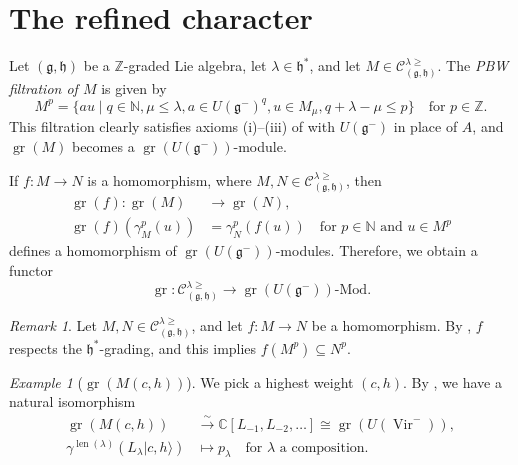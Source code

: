 \documentclass[a4paper, 12pt, reqno]{amsart}
\theoremstyle{remark}
\newtheorem{remark}[theorem]{Remark}
\newtheorem{example}[theorem]{Example}
\DeclareMathOperator{\Vir}{Vir}
\DeclareMathOperator{\len}{len}
\DeclareMathOperator{\gr}{gr}
\begin{document}
\section{The refined character}
\label{sec:refined-character}

Let $(\mathfrak{g}, \mathfrak{h})$ be a $\mathbb{Z}$-graded Lie algebra, let $\lambda \in \mathfrak{h}^*$, and let $M \in \mathcal{C}^{\lambda \ge}_{(\mathfrak{g}, \mathfrak{h})}$.
The \emph{PBW filtration of $M$} is given by
\begin{equation*}
  M^p = \{au \mid q \in \mathbb{N}, \mu \le \lambda, a \in U(\mathfrak{g}^-)^q, u \in M_{\mu}, q + \lambda - \mu \le p\} \quad \text{for $p \in \mathbb{Z}$}.
\end{equation*}
This filtration clearly satisfies axioms (i)--(iii) of  with $U(\mathfrak{g}^-)$ in place of $A$, and $\gr(M)$ becomes a $\gr(U(\mathfrak{g^-}))$-module.

If $f: M \to N$ is a homomorphism, where $M, N \in \mathcal{C}^{\lambda \ge}_{(\mathfrak{g}, \mathfrak{h})}$, then
\begin{align*}
  \gr(f): \gr(M) &\to \gr(N), \\
  \gr(f)(\gamma_M^p(u)) &= \gamma_N^p(f(u)) \quad \text{for $p \in \mathbb{N}$ and $u \in M^p$}
\end{align*}
defines a homomorphism of $\gr(U(\mathfrak{g}^-))$-modules.
Therefore, we obtain a functor
\begin{equation*}
  \gr: \mathcal{C}^{\lambda \ge}_{(\mathfrak{g}, \mathfrak{h})} \to \gr(U(\mathfrak{g}^-))\text{-Mod}.
\end{equation*}

\begin{remark}
  \label{rmk:2}
  Let $M, N \in \mathcal{C}^{\lambda \ge}_{(\mathfrak{g}, \mathfrak{h})}$, and let $f: M \to N$ be a homomorphism.
  By , $f$ respects the $\mathfrak{h}^*$-grading, and this implies $f(M^p) \subseteq N^p$.
\end{remark}

\begin{example}[$\gr(M(c, h))$]
  \label{exa:4}
  We pick a highest weight $(c, h)$.
  By \cite[\S2]{dixmier_enveloping_1996}, we have a natural isomorphism
  \begin{align*}
    \gr(M(c, h)) &\xrightarrow{\sim} \mathbb{C}[L_{-1}, L_{-2}, \dots] \cong \gr(U(\Vir^{-})), \\
    \gamma^{\len(\lambda)}(L_{\lambda}|c, h\rangle) & \mapsto p_{\lambda} \quad \text{for $\lambda$ a composition}.
  \end{align*}
\end{example}
\end{document}
